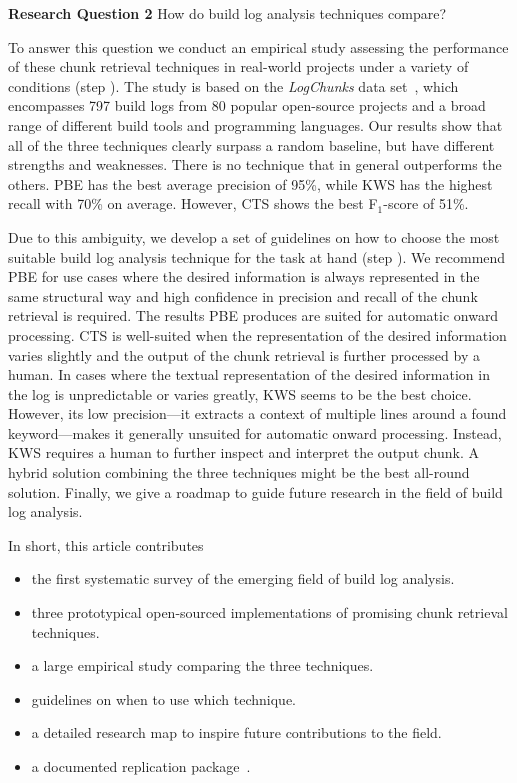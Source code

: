 \begin{simplebox}[minipage boxed title*=-5cm]{\textbf{Research Question
2}}
How do build log analysis techniques compare?
\end{simplebox}

To answer this question
we conduct an empirical study assessing the performance
of these chunk retrieval techniques in
real-world projects under a variety of conditions (step ).
The study is based on the \emph{LogChunks} data
set~\cite{brandt2020logchunks}, which encompasses 797 build logs from
80 popular open-source projects and a broad range of different
build tools and programming languages.
Our results show that all of the three techniques
clearly surpass a random baseline, but have different strengths and
weaknesses.
There is no technique that in general outperforms
the others.
PBE has the best average precision of 95\%, while KWS has the highest
recall with 70\% on average.
However, CTS shows the best F$_{1}$-score
of 51\%.

Due to this ambiguity, we develop a set of guidelines
on how to choose the most suitable build log analysis
technique for the task at hand (step ).
We recommend PBE for use cases where the desired information is always
represented in the same structural way and high confidence in
precision and recall of the chunk retrieval is required.
The results PBE produces are suited for automatic onward processing.
CTS is
well-suited when the representation of the desired information varies
slightly and the output of the chunk retrieval is further processed by
a human.
In cases where the textual representation of the desired
information in the log is unpredictable or varies greatly, KWS seems
to be the best choice.
However, its low precision---it extracts a
context of multiple lines around a found keyword---makes it generally
unsuited for automatic onward processing.
Instead, KWS requires a human
to further inspect and interpret the output chunk.
A hybrid solution combining the three techniques might be the best
all-round solution.
Finally, we give a roadmap to guide future research in the field
of build log analysis.

In short, this article contributes
\begin{itemize}
\item the first systematic survey of the emerging field of build log
analysis.
\item three prototypical open-sourced implementations of
promising chunk retrieval techniques.
\item a large empirical study comparing the three techniques.
\item guidelines on when to use which technique.
\item a detailed research map to inspire future contributions to the
field.
\item a documented replication package~\cite{brandt2020chunk-replication}.
\end{itemize}

